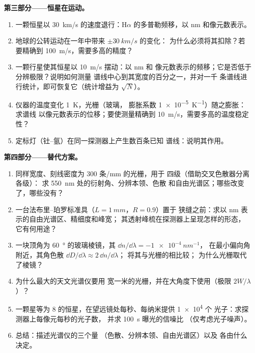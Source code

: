 \begin{problem}
\medskip
\noindent\textbf{第三部分——恒星在运动。}
\begin{enumerate}[resume]
  \item 一颗恒星以 \qty{30}{km/s} 的速度退行：H$\alpha$ 的多普勒频移，以 nm
        和像元数表示。
  \item 地球的公转运动在一年中带来 $\pm\qty{30}{km/s}$ 的变化：
        为什么必须将其扣除？若要精确到
        \qty{100}{m/s}，需要多高的精度？
  \item 一颗行星使其恒星以 \qty{10}{m/s} 摆动：以 nm 和
        像元数表示的频移；它是否低于分辨极限？说明如何测量
        谱线中心到其宽度的百分之一，并对一千
        条谱线进行统计，即可恢复它（统计增益为 $\sqrt{N}$）。
  \item 仪器的温度变化 \qty{1}{K}，光栅（玻璃，
        膨胀系数 \qty{1e-5}{K^{-1}}）随之膨胀：求谱线
        以像元数表示的位移；要使测量精确到 \qty{10}{m/s}，需要多高的温度稳定性？
  \item 定标灯（钍–氩）在同一探测器上产生数百条已知
        谱线：说明其作用。
\end{enumerate}

\medskip
\noindent\textbf{第四部分——替代方案。}
\begin{enumerate}[resume]
  \item 同样宽度、刻线密度为 $300$ 条/mm 的光栅，用于
        四级（借助交叉色散器分离各级）：
        求 \qty{550}{nm} 处的衍射角、分辨本领、色散
        和自由光谱区；哪些改变了，哪些没有？
  \item 一台法布里–珀罗标准具（$L = \qty{1}{mm}$，$R = 0.9$）置于
        狭缝之前：求以 nm 表示的自由光谱区、精细度和峰宽；
        其透射峰梳在探测器上呈现怎样的形态，
        它有何用途？
  \item 一块顶角为 \qty{60}{\degree} 的玻璃棱镜，其 $\dd n/\dd\lambda = \qty{-1e-4}{nm^{-1}}$，
        在最小偏向角附近，其角色散 $\dd D/\dd\lambda \approx 2\,\dd n/\dd\lambda$；
        将其与光栅的相比较；
        为什么光栅取代了棱镜？
  \item 为什么最大的天文光谱仪要用
        宽一米的光栅，并在大角度下使用（极限
        $2W/\lambda$）？
  \item 一颗星等为 8 的恒星，在望远镜处每秒、每纳米提供 \qty{1e4}{} 个
        光子：求探测器上每像元每秒的光子数，
        并求 \qty{100}{s} 曝光的信噪比
        （仅考虑光子噪声）。
  \item 总结：描述光谱仪的三个量
        （色散、分辨本领、自由光谱区）以及
        各由什么决定。
\end{enumerate}
\end{problem}
